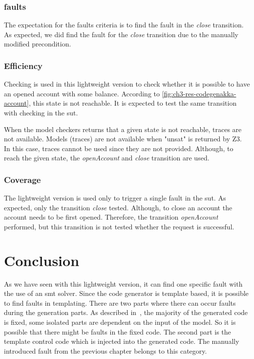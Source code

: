 \subsubsection{faults}
The expectation for the faults criteria is to find the fault in the \textit{close} transition.
As expected, we did find the fault for the \textit{close}
transition due to the manually modified precondition.

\subsubsection{Efficiency}

Checking is used in this lightweight version to check whether it is possible
to have an opened account with some balance. According to
\autoref{fig:ch3-res-codegenakka-account}, this state is not reachable. It is
expected to test the same transition with checking in the \gls{sut}.

When the model checkers returns that a given state is not reachable,
traces are not available. Models (traces) are not available when "unsat" is
returned by Z3.
In this case, traces cannot be used since they are not provided. Although, to
reach the given state, the \textit{openAccount} and \textit{close} transition
are used.


\subsubsection{Coverage}
The lightweight version is used only to trigger a single fault in the \gls{sut}. As
expected, only the transition \textit{close} tested. Although, to close an
account the account needs to be first opened. Therefore, the transition
\textit{openAccount} performed, but this transition is not tested whether the
request is successful.

\section{Conclusion}

As we have seen with this lightweight version, it can find one specific fault with the use of an \gls{smt} solver. Since the code generator is template based, it is possible to find faults in templating. There are two parts where there can occur faults during the generation parts. As described in~\cite[p.~274]{voelter2013dsl}, the majority of the generated code is fixed, some isolated parts are dependent on the input of the model. So it is possible that there might be faults in the fixed code. The second part is the template control code which is injected into the generated code. The manually introduced fault from the previous chapter belongs  to this category.
